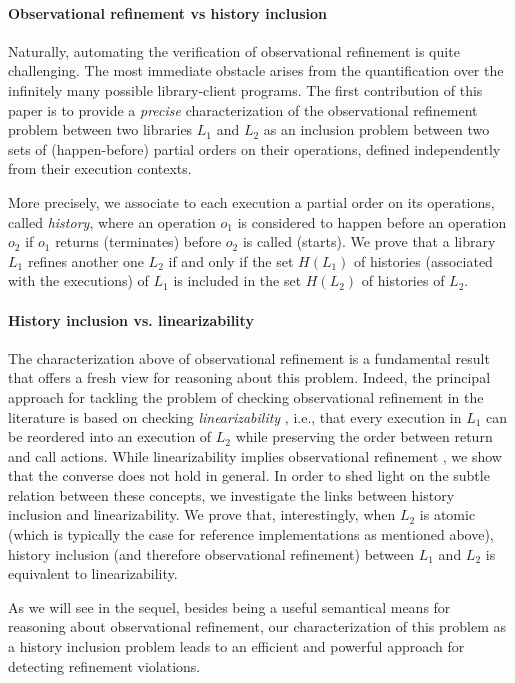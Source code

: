 \paragraph{Observational refinement vs history inclusion}

Naturally, automating the verification of observational refinement is quite
challenging. The most immediate obstacle arises from the quantification over
the infinitely many possible library-client programs. The first contribution of
this paper is to provide a \emph{precise} characterization of the observational
refinement problem between two libraries $L_1$ and $L_2$ as an inclusion
problem between two sets of (happen-before) partial orders on their operations,
defined independently from their execution contexts.

More precisely, we associate to each execution a partial order on its
operations, called \emph{history}, where an operation $o_1$ is considered to
happen before an operation $o_2$ if $o_1$ returns (terminates) before $o_2$ is
called (starts). We prove that a library $L_1$ refines another one $L_2$ if and
only if the set $H(L_1)$ of histories (associated with the executions) of $L_1$
is included in the set $H(L_2)$ of histories of $L_2$.

\paragraph{History inclusion vs. linearizability}

The characterization above of observational refinement is a fundamental result
that offers a fresh view for reasoning about this problem. Indeed, the
principal approach for tackling the problem of checking observational refinement
in the literature is based on checking \emph{linearizability} \cite{}, i.e.,
that every execution in $L_1$ can be reordered into an execution of $L_2$ while
preserving the order between return and call actions. While linearizability
implies observational refinement \cite{}, we show that the converse does not
hold in general. In order to shed light on the subtle relation between these
concepts, we investigate the links between history inclusion and
linearizability. We prove that, interestingly, when $L_2$ is atomic (which is
typically the case for reference implementations as mentioned above), history
inclusion (and therefore observational refinement) between $L_1$ and $L_2$ is
equivalent to linearizability.

As we will see in the sequel, besides being a useful semantical means for
reasoning about observational refinement, our characterization of this problem
as a history inclusion problem leads to an efficient and powerful approach for
detecting refinement violations.

